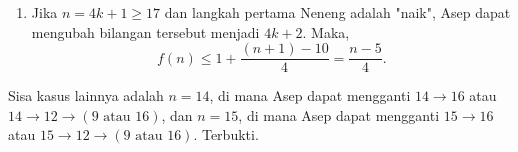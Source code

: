 \begin{solusi}
\begin{enumerate}
    \item Jika $n=4k+1 \geq 17$ dan langkah pertama Neneng adalah "naik", 
    Asep dapat mengubah bilangan tersebut menjadi $4k+2$. Maka,
    \[f(n) \leq 1+\dfrac{(n+1)-10}{4} =\dfrac{n-5}{4}.\]
\end{enumerate}

Sisa kasus lainnya adalah $n=14$, di mana Asep dapat mengganti $14 \to 16$ atau $14 \to 12 \to (9 \text{ atau } 16)$, dan $n=15$, di mana Asep dapat mengganti $15 \to 16$ atau $15 \to 12 \to (9 \text{ atau } 16)$. Terbukti.
\end{solusi}